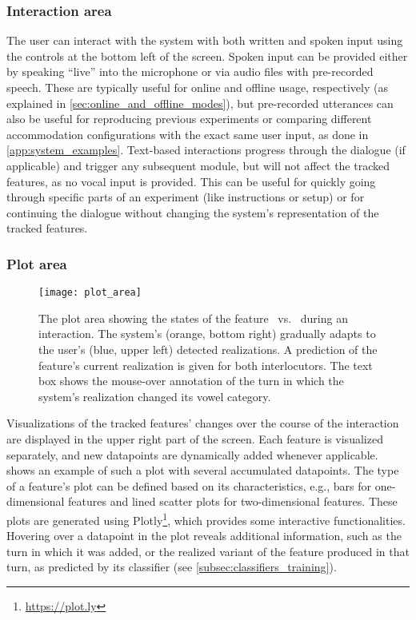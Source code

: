\subsubsection{Interaction area}
\label{subsubsec:interaction_area}

The user can interact with the system with both written and spoken input using the controls at the bottom left of the screen.
Spoken input can be provided either by speaking \enquote{live} into the microphone or via audio files with pre-recorded speech.
These are typically useful for online and offline usage, respectively (as explained in \cref{sec:online_and_offline_modes}), but pre-recorded utterances can also be useful for reproducing previous experiments or comparing different accommodation configurations with the exact same user input, as done in \cref{app:system_examples}.
Text-based interactions progress through the dialogue (if applicable) and trigger any subsequent module, but will not affect the tracked features, as no vocal input is provided.
This can be useful for quickly going through specific parts of an experiment (like instructions or setup) or for continuing the dialogue without changing the system's representation of the tracked features.

\subsubsection{Plot area}
\label{subsubsec:plot_area}

\begin{figure}[t]
	\centering
	\texttt{[image: plot\_area]}
	\caption[Real-time dynamic visualization of phonetic changes]
		{The plot area showing the states of the feature \textipa{[E:]}~vs.~\textipa{[e:]} during an interaction.
		The system's (orange, bottom right) gradually adapts to the user's (blue, upper left) detected realizations.
		A prediction of the feature's current realization is given for both interlocutors.
		The text box shows the mouse-over annotation of the turn in which the system's realization changed its vowel category.}
	\label{fig:plot}
\end{figure}
%
Visualizations of the tracked features' changes over the course of the interaction are displayed in the upper right part of the screen.
Each feature is visualized separately, and new datapoints are dynamically added whenever applicable.
 shows an example of such a plot with several accumulated datapoints.
The type of a feature's plot can be defined based on its characteristics, e.g., bars for one-dimensional features and lined scatter plots for two-dimensional features.
These plots are generated using Plotly\footnote{\url{https://plot.ly}}, which provides some interactive functionalities.
Hovering over a datapoint in the plot reveals additional information, such as the turn in which it was added, or the realized variant of the feature produced in that turn, as predicted by its classifier (see \cref{subsec:classifiers_training}).

